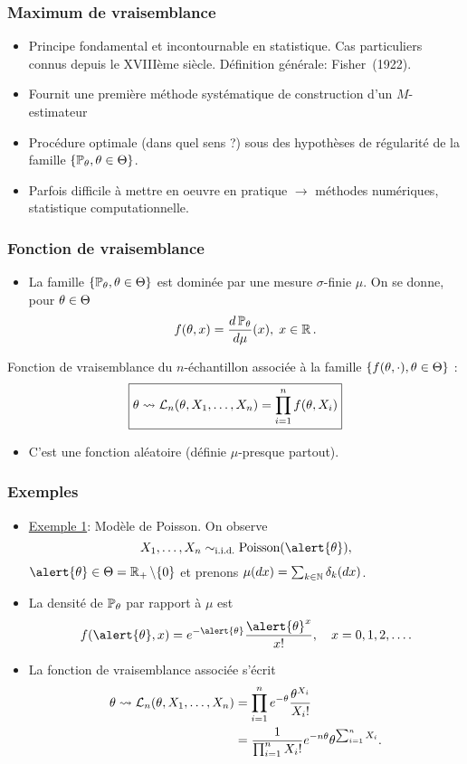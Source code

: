 \begin{frame}
\frametitle{Maximum de vraisemblance}
\begin{itemize}
\item Principe \alert{ fondamental} et
\alert{incontournable} en statistique. Cas particuliers connus
depuis le XVIIIème siècle. D\'efinition g\'en\'erale:
Fisher~(1922).
\item Fournit une première \alert{méthode systématique} de construction d'un $M$-estimateur
\item Procédure \alert{optimale} (dans quel sens ?)
sous des hypothèses de \alert{régularité} de la famille
$\{\operatorname{{\mathbb P}}_\theta, \theta \in \Theta\}$.
\item Parfois difficile à mettre en oeuvre en pratique $\rightarrow$ \alert{méthodes numériques}, statistique
computationnelle.
\end{itemize}
\end{frame}

\begin{frame}
\frametitle{Fonction de vraisemblance}
\begin{itemize}
\item La famille $\{\operatorname{{\mathbb P}}_\theta,\theta \in \Theta\}$ est dominée par une mesure $\sigma$-finie $\mu$. On se donne, pour $\theta \in \Theta$
$$f(\theta,x) = \frac{d\operatorname{{\mathbb P}}_\theta}{d\mu}(x),\;x \in \operatorname{{\mathbb R}}.$$
\end{itemize}
\alert{Fonction de vraisemblance} du $n$-échantillon associée à la famille $\{f(\theta,\cdot),\theta \in \Theta\}$ :
$$\boxed{\theta \leadsto {\mathcal L}_n(\theta, X_1,\ldots, X_n) = \prod_{i = 1}^n f(\theta, X_i)}$$
\begin{itemize}
\item C'est une fonction aléatoire (définie $\mu$-presque partout).
\end{itemize}
\end{frame}

\begin{frame}
\frametitle{Exemples}
\begin{itemize}
\item \underline{Exemple 1}: \alert{Modèle de Poisson}. On observe
$$X_1,\ldots, X_n \sim_{\text{i.i.d.}}\text{Poisson}(\alert{\truetheta}),$$
$\alert{\truetheta} \in \Theta = \R_+\setminus \{0\}$ et prenons
$\mu(dx) = \sum_{k \in \operatorname{{\mathbb N}}}\delta_k(dx)$.
\item La densit\'e de $\operatorname{{\mathbb P}}_\theta$ par rapport \`a $\mu$ est
$$f(\alert{\truetheta}, x) = e^{-\alert{\truetheta}}
\frac{\alert{\truetheta}^x}{x!}, \quad x=0,1,2,\dots.$$
\item La \alert{ fonction de vraisemblance} associée s'écrit
\begin{align*}
\theta \leadsto {\mathcal L}_n(\theta, X_1,\ldots, X_n)
&= \prod_{i = 1}^n e^{-\theta}\frac{\theta^{X_i}}{X_i!} \\
&= \frac{1}{\prod_{i = 1}^nX_i!} e^{-n\theta} \theta^{\sum_{i = 1}^n X_i}.
\end{align*}
\end{itemize}
\end{frame}

